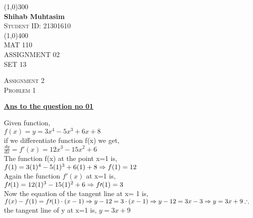 \documentclass{article}
\begin{document}
 
    \begin{titlepage}
    \begin{center}
    \line(1,0){300}\\
    [0.25 in]
    \huge{\bfseries Shihab Muhtasim}\\
    [0.5 cm]
    \textsc{\Large Student ID: 21301610}\\
    \line(1,0){400}\\
    [2 cm]
    \textsc{\LARGE MAT 110}\\
    [0.5 cm]
    \textsc{\LARGE ASSIGNMENT 02}\\
    [0.5 cm]
    \textsc{\LARGE SET 13}\\
    \end{center}
    \end{titlepage}
\begin{newpage}
    \begin{flushright}
    \textsc{Assignment 2}\\
    \textsc{Problem 1}\\
    [1 cm]
    \end{flushright}
\begin{center}
  \textbf{\Large \underline {Ans to the question no 01}}\\
  [1 cm]
\end{center}
\Large {Given function, \\[3mm]
$ f(x)=y = 3x^4-5x^3+6x+8 $\\[3mm]
if we differentiate function f(x) we get,\\[3mm]
$ \frac{dy}{dx}= f\prime (x)= 12x^3-15x^2+6$\\[5mm]
The function f(x) at the point x=1 is,\\[3mm]
$ f(1)= 3(1)^4-5(1)^3+6(1)+8\\[3mm]
\Rightarrow f(1)= 12$} \\[3mm]
Again the function $f\prime(x)$ at x=1 is,\\[3mm]
$ f\prime(1)= 12(1)^3-15(1)^2+6\\[3mm]
\Rightarrow f\prime(1)= 3$ \\[5mm]
Now the equation of the tangent line at x= 1 is,\\[3mm]
$f(x)-f(1)=f\prime(1)\cdot (x-1)\\[3mm]
\Rightarrow y-12= 3 \cdot (x-1) \\[3mm]
\Rightarrow y-12= 3x-3\\[3mm]
\Rightarrow y= 3x+9\\[3mm]
\therefore $ the tangent line of y at x=1 is, $ y=3x+9$
\end{newpage}
\end{document}
